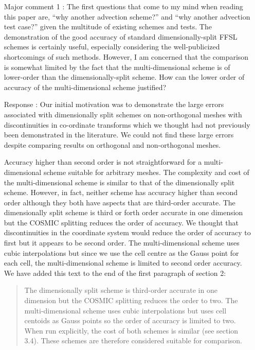 \documentclass[12pt]{article}
\begin{document}
\begin{enumerate}
\item [Major comment 1]: The first questions that come to my mind when reading this paper are, ``why another advection scheme?'' and ``why another advection test case?'' given the multitude of existing schemes and tests. The demonstration of the good accuracy of standard dimensionally-split FFSL schemes is certainly useful, especially considering the well-publicized shortcomings of such methods. However, I am concerned that the comparison is somewhat limited by the fact that the multi-dimensional scheme is of lower-order than the dimensionally-split scheme. How can the lower order of accuracy of the multi-dimensional scheme justified?

\item [Response]: 
Our initial motivation was to demonstrate the large errors associated with dimensionally split schemes on non-orthogonal meshes with discontinuities in co-ordinate transforms which we thought had not previously been demonstrated in the literature. We could not find these large errors despite comparing results on orthogonal and non-orthogonal meshes. 

Accuracy higher than second order is not straightforward for a multi-dimensional scheme suitable for arbitrary meshes. The complexity and cost of the multi-dimensional scheme is similar to that of the dimensionally split scheme. However, in fact, neither scheme has accuracy higher than second order although they both have aspects that are third-order accurate. The dimensionally split scheme is third or forth order accurate in one dimension but the COSMIC splitting reduces the order of accuracy. We thought that discontinuities in the coordinate system would reduce the order of accuracy to first but it appears to be second order. The multi-dimensional scheme uses cubic interpolations but since we use the cell centre as the Gauss point for each cell, the multi-dimensional scheme is limited to second order accuracy. We have added this text to the end of the first paragraph of section 2:
\begin{quote}
The dimensionally split scheme is third-order accurate in one dimension but the COSMIC splitting reduces the order to two. The multi-dimensional scheme uses cubic interpolations but uses cell centoids as Gauss points so the order of accuracy is limited to two. When run explicitly, the cost of both schemes is similar (see section 3.4). These schemes are therefore considered suitable for comparison. 
\end{quote}


\end{enumerate}
\end{document}
